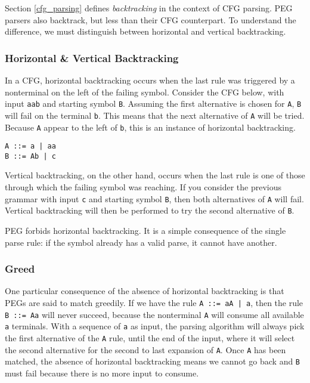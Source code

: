 Section \ref{cfg_parsing} defines \emph{backtracking} in the context of CFG
parsing. PEG parsers also backtrack, but less than their CFG counterpart. To
understand the difference, we must distinguish between horizontal and vertical
backtracking.

\subsubsection{Horizontal \& Vertical Backtracking}

In a CFG, horizontal backtracking occurs when the last rule was triggered by a
nonterminal on the left of the failing symbol. Consider the CFG below, with
input \texttt{aab} and starting symbol \texttt{B}. Assuming the first
alternative is chosen for \texttt{A}, \texttt{B} will fail on the terminal
\texttt{b}. This means that the next alternative of \texttt{A} will be
tried. Because \texttt{A} appear to the left of \texttt{b}, this is an instance
of horizontal backtracking.

\begin{lstlisting}
A ::= a | aa
B ::= Ab | c
\end{lstlisting}

Vertical backtracking, on the other hand, occurs when the last rule is one of
those through which the failing symbol was reaching. If you consider the
previous grammar with input \texttt{c} and starting symbol \texttt{B}, then both
alternatives of \texttt{A} will fail. Vertical backtracking will then be
performed to try the second alternative of \texttt{B}.

PEG forbids horizontal backtracking. It is a simple consequence of the single
parse rule: if the symbol already has a valid parse, it cannot have another.

\subsubsection{Greed}

One particular consequence of the absence of horizontal backtracking is that
PEGs are said to match greedily. If we have the rule \texttt{A ::= aA | a}, then
the rule \texttt{B ::= Aa} will never succeed, because the nonterminal
\texttt{A} will consume all available \texttt{a} terminals. With a sequence of
\texttt{a} as input, the parsing algorithm will always pick the first
alternative of the \texttt{A} rule, until the end of the input, where it will
select the second alternative for the second to last expansion of
\texttt{A}. Once \texttt{A} has been matched, the absence of horizontal
backtracking means we cannot go back and \texttt{B} must fail because there is
no more input to consume.

